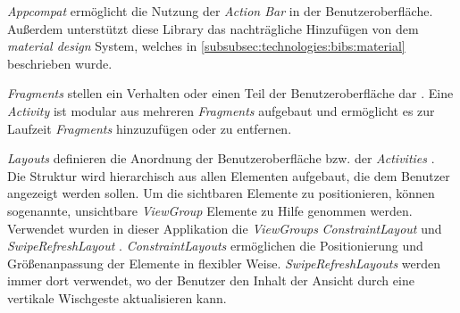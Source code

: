 \documentclass[a4paper]{article}
\begin{document}
\textit{Appcompat} \autocite{android_appcompat} ermöglicht die Nutzung der \textit{Action Bar} \autocite{android_action_bar} in der Benutzeroberfläche. Außerdem unterstützt diese Library das nachträgliche Hinzufügen von dem \textit{material design} System, welches in \autoref{subsubsec:technologies:bibs:material} beschrieben wurde.

\textit{Fragments} stellen ein Verhalten oder einen Teil der Benutzeroberfläche dar \autocite{android_fragments}. Eine \textit{Activity} ist modular aus mehreren \textit{Fragments} aufgebaut und ermöglicht es zur Laufzeit \textit{Fragments} hinzuzufügen oder zu entfernen.

\textit{Layouts} definieren die Anordnung der Benutzeroberfläche bzw. der \textit{Activities} \autocite{android_layouts}. Die Struktur wird hierarchisch aus allen Elementen aufgebaut, die dem Benutzer angezeigt werden sollen. Um die sichtbaren Elemente zu positionieren, können sogenannte, unsichtbare \textit{ViewGroup} Elemente zu Hilfe genommen werden. Verwendet wurden in dieser Applikation die \textit{ViewGroups} \textit{ConstraintLayout} \autocite{android_constraintlayout} und \textit{SwipeRefreshLayout} \autocite{android_swiperefreshlayout}. \textit{ConstraintLayouts} ermöglichen die Positionierung und Größenanpassung der Elemente in flexibler Weise. \textit{SwipeRefreshLayouts} werden immer dort verwendet, wo der Benutzer den Inhalt der Ansicht durch eine vertikale Wischgeste aktualisieren kann.
\end{document}
